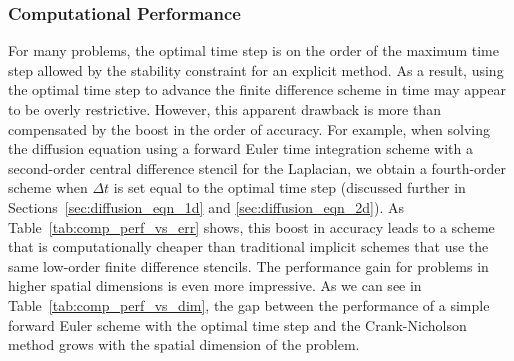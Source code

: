\documentclass[fleqn,12pt,twoside]{article}
\def\dt{\Delta t}
\begin{document}
\subsubsection*{\label{sec:computational_performance} 
                Computational Performance}
For many problems, the optimal time step is on the order of the maximum 
time step allowed by the stability constraint for an explicit method.  
As a result, using the optimal time step to advance the finite
difference scheme in time may appear to be overly restrictive.
However, this apparent drawback is more than 
compensated by the boost in the order of accuracy.  For example, when solving 
the diffusion equation using a forward Euler time integration scheme with a 
second-order central difference stencil for the Laplacian, we obtain a 
fourth-order scheme when $\dt$ is set equal to the optimal time step 
(discussed further in Sections~\ref{sec:diffusion_eqn_1d} and
\ref{sec:diffusion_eqn_2d}).  
As Table~\ref{tab:comp_perf_vs_err} shows, this boost in accuracy leads to a
scheme that is computationally cheaper than traditional implicit schemes that
use the same low-order finite difference stencils.  The performance gain for 
problems in higher spatial dimensions is even more impressive.  As we can see 
in Table~\ref{tab:comp_perf_vs_dim}, the gap between the performance of a
simple forward Euler scheme with the optimal time step and the Crank-Nicholson
method grows with the spatial dimension of the problem.  
\end{document}
